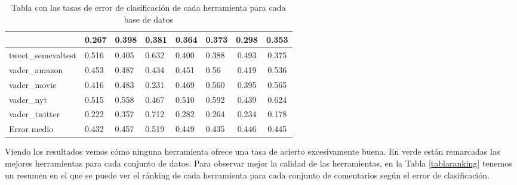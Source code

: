 \begin{table}[H]
{\begin{tabular}{|llllb{1.5cm}b{1.5cm}cc|}
		& 
		\cellcolor{greentable} 0.267
		& 
		0.398
		& 
		0.381
		& 
		0.364
		& 
		0.373
		& 
		0.298
		& 
		0.353
		\\ \hline
		tweet\_semevaltest
		& 
		0.516
		& 
		0.405
		& 
		0.632
		& 
		0.400
		& 
		0.388
		& 
		0.493
		& 
		\cellcolor{greentable} 0.375
		\\ \hline
		vader\_amazon
		& 
		0.453
		& 
		0.487
		& 
		0.434
		& 
		0.451
		& 
		0.56
		& 
		\cellcolor{greentable} 0.419
		& 
		0.536
		\\ \hline
		vader\_movie
		& 
		0.416
		& 
		0.483
		& 
		\cellcolor{greentable} 0.231
		& 
		0.469
		& 
		0.560
		& 
		0.395
		& 
		0.565
		\\ \hline
		vader\_nyt
		& 
		0.515
		& 
		0.558
		& 
		0.467
		& 
		0.510
		& 
		0.592
		& 
		\cellcolor{greentable} 0.439
		& 
		0.624
		\\ \hline
		vader\_twitter
		& 
		0.222
		& 
		0.357
		& 
		0.712
		& 
		0.282
		& 
		0.264
		& 
		0.234
		& 
		\cellcolor{greentable} 0.178
		\\ \hline
		Error medio & 0.432 & 0.457 & 0.519 & 0.449 & 0.435 & 0.446 & 0.445 \\ \hline
\end{tabular} } 
	\caption{Tabla con las tasas de error de clasificación de cada herramienta para cada base de datos}
\label{TABLA_ERRORES}
\end{table}

Viendo los resultados vemos cómo ninguna herramienta ofrece una tasa de acierto excesivamente buena. En verde están remarcadas las mejores herramientas para cada conjunto de datos. Para observar mejor la calidad de las herramientas, en la Tabla \ref{tablaranking} tenemos un resumen en el que se puede ver el ránking de cada herramienta para cada conjunto de comentarios según el error de clasificación.

\newpage

